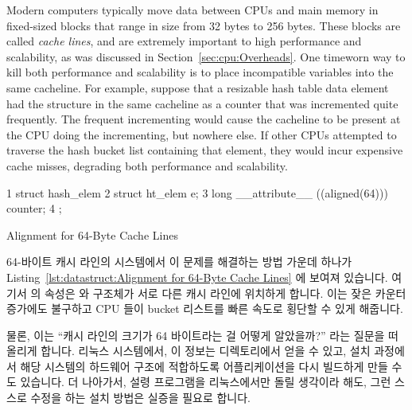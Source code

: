 Modern computers typically move data between CPUs and main memory in
fixed-sized blocks that range in size from 32 bytes to 256 bytes.
These blocks are called \emph{cache lines}, and are extremely important
to high performance and scalability, as was discussed in
Section~\ref{sec:cpu:Overheads}.
One timeworn way to kill both performance and scalability is to
place incompatible variables into the same cacheline.
For example, suppose that a resizable hash table data element had
the  structure in the same cacheline as a counter that
was incremented quite frequently.
The frequent incrementing would cause the cacheline to be present at
the CPU doing the incrementing, but nowhere else.
If other CPUs attempted to traverse the hash bucket list containing
that element, they would incur expensive cache misses, degrading both
performance and scalability.
\fi

\begin{listing}[tb]
{ \scriptsize
\begin{verbbox}
1 struct hash_elem {
2   struct ht_elem e;
3   long __attribute__ ((aligned(64))) counter;
4 };
\end{verbbox}
}
\centering
\theverbbox
\caption{Alignment for 64-Byte Cache Lines}
\label{lst:datastruct:Alignment for 64-Byte Cache Lines}
\end{listing}

64-바이트 캐시 라인의 시스템에서 이 문제를 해결하는 방법 가운데 하나가
Listing~\ref{lst:datastruct:Alignment for 64-Byte Cache Lines} 에 보여져
있습니다.
여기서 \GCC 의  속성은  와  구조체가
서로 다른 캐시 라인에 위치하게 합니다.
이는 잦은 카운터 증가에도 불구하고 CPU 들이 bucket 리스트를 빠른 속도로 횡단할
수 있게 해줍니다.

물론, 이는 ``캐시 라인의 크기가 64 바이트라는 걸 어떻게 알았을까?'' 라는 질문을
떠올리게 합니다.
리눅스 시스템에서, 이 정보는 
디렉토리에서 얻을 수 있고, 설치 과정에서 해당 시스템의 하드웨어 구조에
적합하도록 어플리케이션을 다시 빌드하게 만들 수도 있습니다.
더 나아가서, 설령 프로그램을 리눅스에서만 돌릴 생각이라 해도, 그런 스스로
수정을 하는 설치 방법은 실증을 필요로 합니다.
\iffalse

